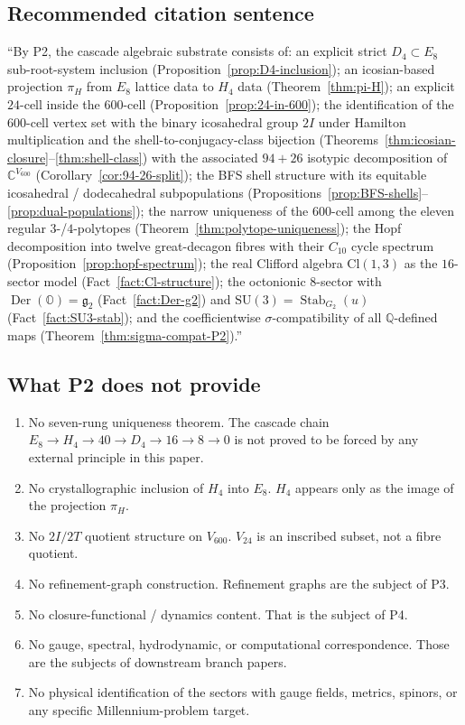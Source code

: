 \documentclass[11pt, a4paper]{amsart}
\theoremstyle{definition}
\newcommand{\Q}{\mathbb{Q}}
\newcommand{\C}{\mathbb{C}}
\newcommand{\OO}{\mathbb{O}}
\newcommand{\Der}{\operatorname{Der}}
\newcommand{\Stab}{\operatorname{Stab}}
\newcommand{\Cl}{\mathrm{Cl}}
\newcommand{\SU}{\mathrm{SU}}
\begin{document}
\subsection{Recommended citation sentence}

``By P2, the cascade algebraic substrate consists of:
an explicit strict $D_4 \subset E_8$ sub-root-system inclusion
(Proposition~\ref{prop:D4-inclusion}); an icosian-based projection
$\pi_H$ from $E_8$ lattice data to $H_4$ data
(Theorem~\ref{thm:pi-H}); an explicit $24$-cell inside the
$600$-cell (Proposition~\ref{prop:24-in-600}); the identification
of the $600$-cell vertex set with the binary icosahedral group
$2I$ under Hamilton multiplication and the shell-to-conjugacy-class
bijection (Theorems~\ref{thm:icosian-closure}--\ref{thm:shell-class})
with the associated $94{+}26$ isotypic decomposition of
$\C^{V_{600}}$ (Corollary~\ref{cor:94-26-split}); the BFS shell
structure with its equitable icosahedral / dodecahedral
subpopulations (Propositions~\ref{prop:BFS-shells}--\ref{prop:dual-populations});
the narrow uniqueness of the $600$-cell among the eleven regular
$3$-/$4$-polytopes (Theorem~\ref{thm:polytope-uniqueness}); the
Hopf decomposition into twelve great-decagon fibres with their
$C_{10}$ cycle spectrum (Proposition~\ref{prop:hopf-spectrum});
the real Clifford algebra $\Cl(1,3)$ as the $16$-sector model
(Fact~\ref{fact:Cl-structure}); the octonionic $8$-sector with
$\Der(\OO) = \mathfrak{g}_2$ (Fact~\ref{fact:Der-g2}) and
$\SU(3) = \Stab_{G_2}(u)$ (Fact~\ref{fact:SU3-stab});
and the coefficientwise $\sigma$-compatibility of all $\Q$-defined
maps (Theorem~\ref{thm:sigma-compat-P2}).''

\subsection{What P2 does not provide}

\begin{enumerate}
\item No seven-rung uniqueness theorem. The cascade chain
  $E_8 \to H_4 \to 40 \to D_4 \to 16 \to 8 \to 0$ is not proved
  to be forced by any external principle in this paper.
\item No crystallographic inclusion of $H_4$ into $E_8$. $H_4$
  appears only as the image of the projection $\pi_H$.
\item No $2I/2T$ quotient structure on $V_{600}$. $V_{24}$ is an
  inscribed subset, not a fibre quotient.
\item No refinement-graph construction. Refinement graphs are the
  subject of P3.
\item No closure-functional / dynamics content. That is the
  subject of P4.
\item No gauge, spectral, hydrodynamic, or computational
  correspondence. Those are the subjects of downstream branch
  papers.
\item No physical identification of the sectors with gauge fields,
  metrics, spinors, or any specific Millennium-problem target.
\end{enumerate}
\end{document}
